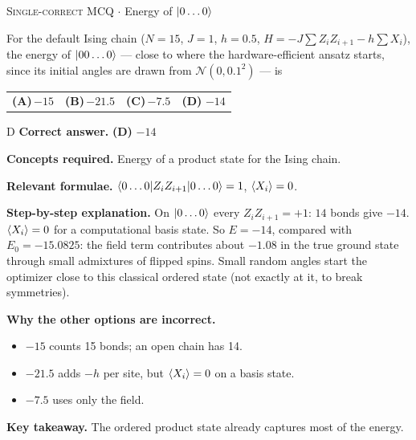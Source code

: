 \documentclass[11pt,a4paper]{article}
\newcommand{\optlabel}[1]{\textbf{(#1)}}
\newcommand{\correctlabel}[1]{\textcolor{okgreen}{\textbf{(#1)}\,\ding{51}}}
\newenvironment{qitem}[1]{\begin{list}{}{\setlength{\leftmargin}{3.3em}\setlength{\labelwidth}{3.1em}%
  \setlength{\labelsep}{0.2em}\setlength{\topsep}{3pt}\setlength{\parsep}{3pt}}\item[\textbf{Q.#1}\hfill]}{\end{list}}
\newcommand{\qsep}{\par\vspace{2pt}{\color{black!15}\hrule}\vspace{4pt}}
\newcommand{\qmeta}[2]{{\footnotesize\color{black!60}\textsc{#1} \;$\cdot$\; #2}\par}
\begin{document}
\begin{qitem}{50}
\qmeta{Single-correct MCQ}{Energy of $\ket{0\dots0}$}
For the default Ising chain ($N = 15$, $J = 1$, $h = 0.5$, $H = -J\sum Z_iZ_{i+1} - h\sum X_i$), the energy of $\ket{00\dots0}$ --- close to where the
hardware-efficient ansatz starts, since its initial angles are drawn from $\mathcal N(0, 0.1^2)$ --- is
\par\smallskip\noindent\begin{tabularx}{\linewidth}{@{}*{4}{L}@{}}
\optlabel{A}\,$-15$ & \optlabel{B}\,$-21.5$ & \optlabel{C}\,$-7.5$ & \correctlabel{D}\,$-14$
\end{tabularx}
\end{qitem}
\begin{solbox}{D}
\textbf{\color{brand}Correct answer.} \textcolor{okgreen}{\textbf{(D)}} $-14$

\textbf{\color{brand}Concepts required.} Energy of a product state for the Ising chain.

\textbf{\color{brand}Relevant formulae.} $\braket{0\dots0|Z_iZ_{i+1}|0\dots0} = 1$, $\braket{X_i} = 0$.

\textbf{\color{brand}Step-by-step explanation.} On $\ket{0\dots0}$ every $Z_iZ_{i+1} = +1$: $14$ bonds give $-14$. $\braket{X_i} = 0$ for a computational basis state. So $E = -14$, compared with
$E_0 = -15.0825$: the field term contributes about $-1.08$ in the true ground state through small admixtures of flipped spins.
Small random angles start the optimizer close to this classical ordered state (not exactly at it, to break symmetries).

\textbf{\color{brand}Why the other options are incorrect.}
\begin{itemize}[leftmargin=2.4em, itemsep=1pt, topsep=2pt]
\item[\textbf{(A)}] $-15$ counts 15 bonds; an open chain has 14.
\item[\textbf{(B)}] $-21.5$ adds $-h$ per site, but $\braket{X_i} = 0$ on a basis state.
\item[\textbf{(C)}] $-7.5$ uses only the field.
\end{itemize}
\textbf{\color{brand}Key takeaway.} The ordered product state already captures most of the energy.
\end{solbox}
\qsep
\end{document}

